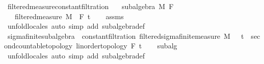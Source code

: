 \begin{isabellebody}
\endisatagproof
{\isafoldproof}%
%
\isadelimproof
%
\endisadelimproof
%
\isadelimdocument
%
\endisadelimdocument
%
\isatagdocument
%
\isamarkuptrue%
%
\endisatagdocument
{\isafolddocument}%
%
\isadelimdocument
%
\endisadelimdocument
{}\isamarkupfalse%
\ filtered{\isacharunderscore}{\kern0pt}measure{\isacharunderscore}{\kern0pt}constant{\isacharunderscore}{\kern0pt}filtration{\isacharcolon}{\kern0pt}\isanewline
\ \ \ {\isachardoublequoteopen}subalgebra\ M\ F{\isachardoublequoteclose}\isanewline
\ \ \ {\isachardoublequoteopen}filtered{\isacharunderscore}{\kern0pt}measure\ M\ {\isacharparenleft}{\kern0pt}{\isasymlambda}{\isacharunderscore}{\kern0pt}{\isachardot}{\kern0pt}\ F{\isacharparenright}{\kern0pt}\ t\isanewline
%
\isadelimproof
\ \ %
\endisadelimproof
%
\isatagproof
{}\isamarkupfalse%
\ assms\ \isamarkupfalse%
\ {\isacharparenleft}{\kern0pt}unfold{\isacharunderscore}{\kern0pt}locales{\isacharparenright}{\kern0pt}\ {\isacharparenleft}{\kern0pt}auto\ simp\ add{\isacharcolon}{\kern0pt}\ subalgebra{\isacharunderscore}{\kern0pt}def{\isacharparenright}{\kern0pt}%
\endisatagproof
{\isafoldproof}%
%
\isadelimproof
\isanewline
%
\endisadelimproof
\isanewline
{}\isamarkupfalse%
\ sigma{\isacharunderscore}{\kern0pt}finite{\isacharunderscore}{\kern0pt}subalgebra\ {\isasymsubseteq}\ constant{\isacharunderscore}{\kern0pt}filtration{\isacharcolon}{\kern0pt}\ filtered{\isacharunderscore}{\kern0pt}sigma{\isacharunderscore}{\kern0pt}finite{\isacharunderscore}{\kern0pt}measure\ M\ {\isachardoublequoteopen}{\isasymlambda}{\isacharunderscore}{\kern0pt}\ {\isacharcolon}{\kern0pt}{\isacharcolon}{\kern0pt}\ {\isacharprime}{\kern0pt}t\ {\isacharcolon}{\kern0pt}{\isacharcolon}{\kern0pt}\ {\isacharbraceleft}{\kern0pt}second{\isacharunderscore}{\kern0pt}countable{\isacharunderscore}{\kern0pt}topology{\isacharcomma}{\kern0pt}\ linorder{\isacharunderscore}{\kern0pt}topology{\isacharbraceright}{\kern0pt}{\isachardot}{\kern0pt}\ F{\isachardoublequoteclose}\ t\isanewline
%
\isadelimproof
\ \ %
\endisadelimproof
%
\isatagproof
{}\isamarkupfalse%
\ subalg\ \isamarkupfalse%
\ {\isacharparenleft}{\kern0pt}unfold{\isacharunderscore}{\kern0pt}locales{\isacharparenright}{\kern0pt}\ {\isacharparenleft}{\kern0pt}auto\ simp\ add{\isacharcolon}{\kern0pt}\ subalgebra{\isacharunderscore}{\kern0pt}def{\isacharparenright}{\kern0pt}%
\endisatagproof

\end{isabellebody}
